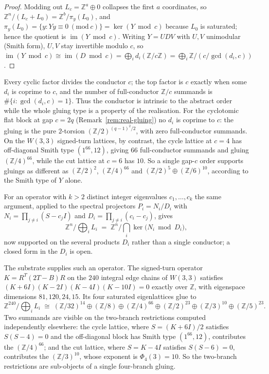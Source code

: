\documentclass[11pt]{article}
\theoremstyle{plain}
\theoremstyle{definition}
\newcommand{\ZZ}{\mathbb Z}
\begin{document}
\begin{proof}
Modding out $L_c=\ZZ^a\oplus 0$ collapses the first $a$ coordinates, so
$\ZZ^n/(L_c+L_0)=\ZZ^b/\pi_y(L_0)$, and $\pi_y(L_0)=\{y:Yy\equiv 0\ (\mathrm{mod}\ c)\}
=\ker(Y\bmod c)$ because $L_0$ is saturated; hence the quotient is
$\operatorname{im}(Y\bmod c)$. Writing $Y=UDV$ with $U,V$ unimodular (Smith form),
$U,V$ stay invertible modulo $c$, so $\operatorname{im}(Y\bmod c)\cong
\operatorname{im}(D\bmod c)=\bigoplus_i d_i(\ZZ/c\ZZ)
=\bigoplus_i \ZZ/(c/\gcd(d_i,c))$.
\end{proof}

Every cyclic factor divides the conductor $c$; the top factor is $c$ exactly
when some $d_i$ is coprime to $c$, and the number of full-conductor $\ZZ/c$
summands is $\#\{i:\gcd(d_i,c)=1\}$. Thus the conductor is intrinsic to the
abstract order while the whole gluing type is a property of the realisation. For
the cyclotomic flat block at gap $c=2q$ (Remark~\ref{rem:real-gluing}) no $d_i$
is coprime to $c$: the gluing is the pure $2$-torsion $(\ZZ/2)^{(q-1)^2/2}$, with
zero full-conductor summands. On the $W(3,3)$ signed-turn lattices, by contrast,
the cycle lattice at $c=4$ has off-diagonal Smith type $(1^{66},12)$, giving
$66$ full-conductor summands and gluing $(\ZZ/4)^{66}$, while the cut lattice at
$c=6$ has $10$. So a single gap-$c$ order supports gluings as different as
$(\ZZ/2)^{2}$, $(\ZZ/4)^{66}$ and $(\ZZ/2)^5\oplus(\ZZ/6)^{10}$, according to the
Smith type of $Y$ alone.

For an operator with $k>2$ distinct integer eigenvalues $c_1,\dots,c_k$ the same
argument, applied to the spectral projectors $P_i=N_i/D_i$ with
$N_i=\prod_{j\neq i}(S-c_jI)$ and $D_i=\prod_{j\neq i}(c_i-c_j)$, gives
\[
\ZZ^n/\textstyle\bigoplus_i L_i\;=\;\ZZ^n/\bigcap_i\ker\!\bigl(N_i\bmod D_i\bigr),
\]
now supported on the several products $D_i$ rather than a single conductor; a
closed form in the $D_i$ is open.

The substrate supplies such an operator. The signed-turn operator
$K=R^{T}(2T-B)R$ on the $240$ integral edge chains of $W(3,3)$ satisfies
$(K+6I)(K-2I)(K-4I)(K-10I)=0$ exactly over $\ZZ$, with eigenspace dimensions
$81,120,24,15$. Its four saturated eigenlattices glue to
\[
\ZZ^{240}\big/\textstyle\bigoplus_i L_i\;\cong\;
(\ZZ/32)^{14}\oplus(\ZZ/8)\oplus(\ZZ/4)^{66}\oplus(\ZZ/2)^{23}
\oplus(\ZZ/3)^{10}\oplus(\ZZ/5)^{23}.
\]
Two summands are visible on the two-branch restrictions computed independently
elsewhere: the cycle lattice, where $S=(K+6I)/2$ satisfies $S(S-4)=0$ and the
off-diagonal block has Smith type $(1^{66},12)$, contributes the $(\ZZ/4)^{66}$;
and the cut lattice, where $S=K-4I$ satisfies $S(S-6)=0$, contributes the
$(\ZZ/3)^{10}$, whose exponent is $\Phi_4(3)=10$. So the two-branch restrictions
are sub-objects of a single four-branch gluing.
\end{document}
